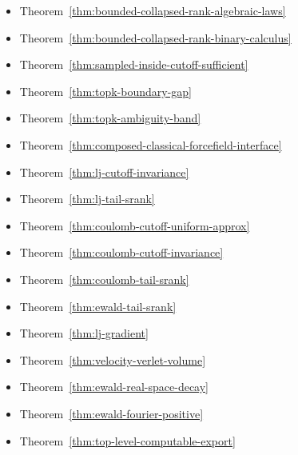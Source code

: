\begin{itemize}
\item Theorem~\ref{thm:bounded-collapsed-rank-algebraic-laws}
\item Theorem~\ref{thm:bounded-collapsed-rank-binary-calculus}
\item Theorem~\ref{thm:sampled-inside-cutoff-sufficient}
\item Theorem~\ref{thm:topk-boundary-gap}
\item Theorem~\ref{thm:topk-ambiguity-band}
\item Theorem~\ref{thm:composed-classical-forcefield-interface}
\item Theorem~\ref{thm:lj-cutoff-invariance}
\item Theorem~\ref{thm:lj-tail-srank}
\item Theorem~\ref{thm:coulomb-cutoff-uniform-approx}
\item Theorem~\ref{thm:coulomb-cutoff-invariance}
\item Theorem~\ref{thm:coulomb-tail-srank}
\item Theorem~\ref{thm:ewald-tail-srank}
\item Theorem~\ref{thm:lj-gradient}
\item Theorem~\ref{thm:velocity-verlet-volume}
\item Theorem~\ref{thm:ewald-real-space-decay}
\item Theorem~\ref{thm:ewald-fourier-positive}
\item Theorem~\ref{thm:top-level-computable-export}
\end{itemize}

